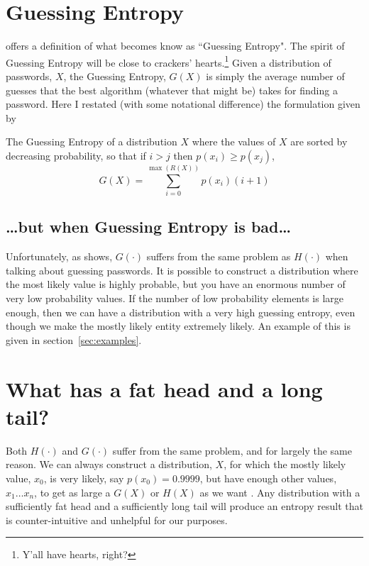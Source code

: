 \documentclass[12pt]{article}
\newcommand\func[1]{\ensuremath{#1(\cdot)}}
\begin{document}
\section{Guessing Entropy}

\textcite{Massey94:ISMT} offers a definition of what becomes know as ``Guessing Entropy". The spirit of Guessing Entropy will be close to crackers' hearts.\footnote{Y'all have hearts, right?} Given a distribution of passwords, $X$, the Guessing Entropy, $G(X)$ is simply the average number of guesses that the best algorithm (whatever that might be) takes for finding a password. Here I restated (with some notational difference) the formulation given by \textcite[p.~19]{Cederlog2005:Thesis}

\begin{Definition}\label{def:G}
The Guessing Entropy of a distribution $X$ where the values of $X$ are sorted by decreasing probability, so that if $i > j$ then $p(x_i) \geq p(x_j)$,
$$
G(X) = \sum_{i=0}^{\max(R(X))} p(x_i)(i+1)
$$
\end{Definition}

\subsection{\dots but when Guessing Entropy is bad\dots}

Unfortunately, as \textcite[p.~19]{Cederlog2005:Thesis} shows, $\func G$ suffers from the same problem as $\func H$ when talking about guessing passwords. It is possible to construct a distribution where the most likely value is highly probable, but you have an enormous number of very low probability values. If the number of low probability elements is large enough, then we can have a distribution with a very high guessing entropy, even though we make the mostly likely entity extremely likely. An example of this is given in section~\ref{sec:examples}.

\section{What has a fat head and a long tail?}

Both $\func H$ and $\func G$ suffer from the same problem, and for largely the same reason. We can always construct a distribution, $X$, for which the mostly likely value, $x_0$, is very likely, say $p(x_0)=0.9999$, but have enough other values, $x_1 \dots x_n$, to get as large a $G(X)$ or $H(X)$ as we want \parencite[ch.~4]{Cederlog2005:Thesis}. Any distribution with a sufficiently fat head and a sufficiently long tail will produce an entropy result that is counter-intuitive and unhelpful for our purposes.
\end{document}
